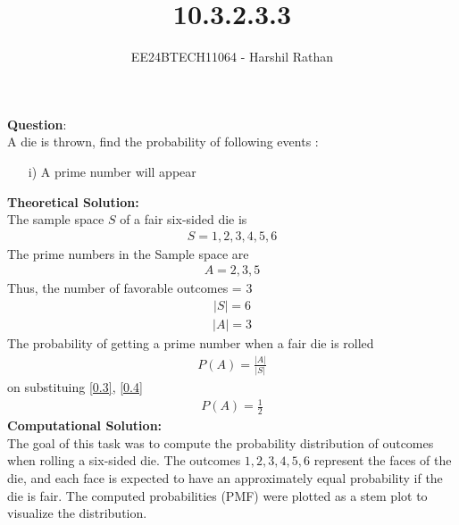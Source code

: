 \documentclass[journal]{IEEEtran}
\begin{document}

\vspace{3cm}

\title{10.3.2.3.3}
\author{EE24BTECH11064 - Harshil Rathan}
 \maketitle
{\let\newpage\relax\maketitle}

\renewcommand{\thefigure}{\theenumi}
\renewcommand{\thetable}{\theenumi}
\setlength{\intextsep}{10pt} %


\renewcommand{\thetable}{\theenumi}
\textbf{Question}:\\
A die is thrown, find the probability of following events : 
\begin{itemize}
    \item[i)] A prime number will appear 
\end{itemize}
\textbf{Theoretical Solution: }\\
The sample space $S$ of a fair six-sided die is
\begin{align}
    S = {1,2,3,4,5,6}
\end{align}
The prime numbers in the Sample space are 
\begin{align}
    A = {2,3,5}
\end{align}
Thus, the number of favorable outcomes = 3 
\begin{align}
    |S| = 6 
    \label{0.3}
\end{align}
\begin{align}
    |A| = 3 
    \label{0.4}
\end{align}
The probability of getting a prime number when a fair die is rolled
\begin{align}
    P(A) = \frac{|A|}{|S|}   
\end{align}
on substituing \ref{0.3}, \ref{0.4}
\begin{align}
    P(A) = \frac{1}{2}
\end{align}
\textbf{Computational Solution: }\\
The goal of this task was to compute the probability distribution of outcomes when rolling a six-sided die. The outcomes \(1, 2, 3, 4, 5, 6\) represent the faces of the die, and each face is expected to have an approximately equal probability if the die is fair. The computed probabilities (PMF) were plotted as a stem plot to visualize the distribution.
\end{document}

